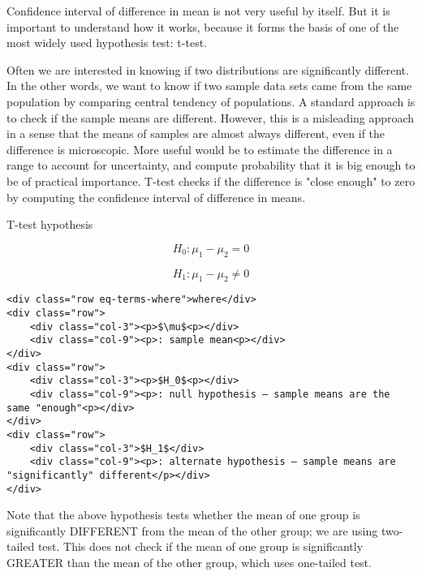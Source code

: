 \documentclass[11pt]{article}
\begin{document}
Confidence interval of difference in mean is not very useful by itself.
But it is important to understand how it works, because it forms the
basis of one of the most widely used hypothesis test: t-test.

Often we are interested in knowing if two distributions are
significantly different. In the other words, we want to know if two
sample data sets came from the same population by comparing central
tendency of populations. A standard approach is to check if the sample
means are different. However, this is a misleading approach in a sense
that the means of samples are almost always different, even if the
difference is microscopic. More useful would be to estimate the
difference in a range to account for uncertainty, and compute
probability that it is big enough to be of practical importance. T-test
checks if the difference is "close enough" to zero by computing the
confidence interval of difference in means.

T-test hypothesis

\[ H_0: \mu_1 - \mu_2 = 0 \tag{2}\]

\[ H_1: \mu_1 - \mu_2 \neq 0 \tag{3}\]

\begin{verbatim}
<div class="row eq-terms-where">where</div>
<div class="row">
    <div class="col-3"><p>$\mu$<p></div>
    <div class="col-9"><p>: sample mean<p></div>
</div> 
<div class="row">
    <div class="col-3"><p>$H_0$<p></div>
    <div class="col-9"><p>: null hypothesis — sample means are the same "enough"<p></div>
</div>
<div class="row">
    <div class="col-3">$H_1$</div>
    <div class="col-9"><p>: alternate hypothesis — sample means are "significantly" different</p></div>
</div>    
\end{verbatim}

Note that the above hypothesis tests whether the mean of one group is
significantly DIFFERENT from the mean of the other group; we are using
two-tailed test. This does not check if the mean of one group is
significantly GREATER than the mean of the other group, which uses
one-tailed test.

\hypertarget{anova}{}
\end{document}
